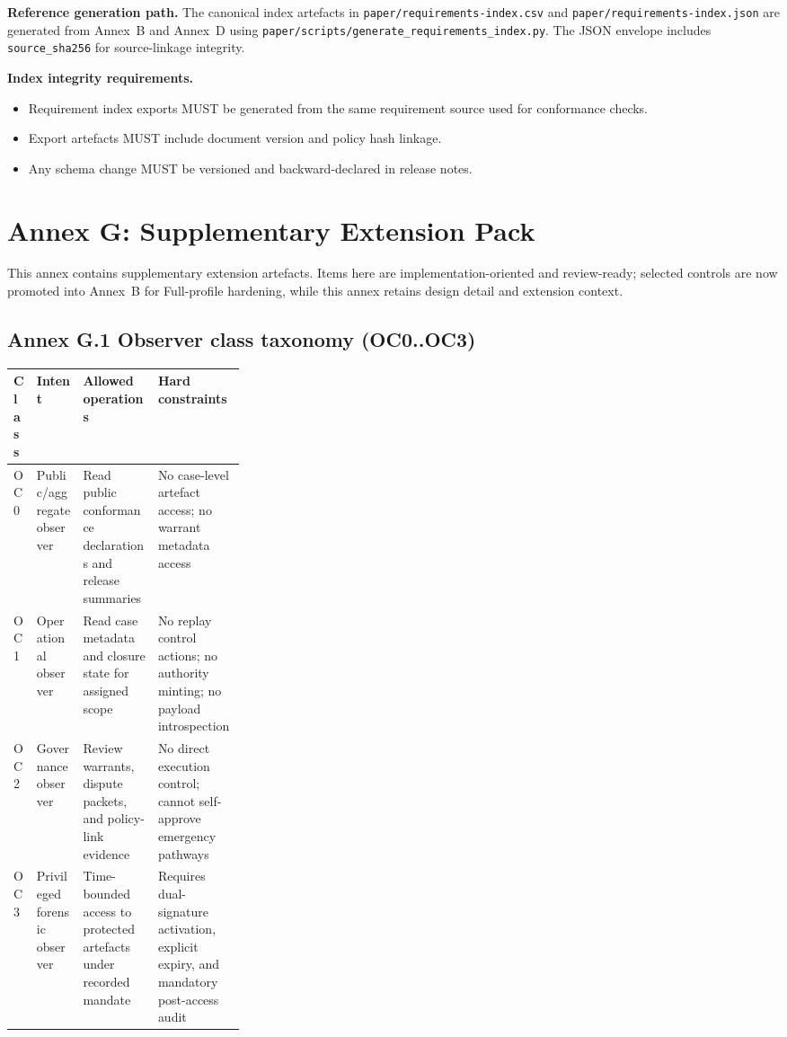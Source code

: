 \documentclass[11pt]{article}
\theoremstyle{definition}
\theoremstyle{plain}
\theoremstyle{remark}
\begin{document}
\textbf{Reference generation path.}
The canonical index artefacts in \texttt{paper/requirements-index.csv} and
\texttt{paper/requirements-index.json} are generated from Annex~B and Annex~D
using \texttt{paper/scripts/generate\_requirements\_index.py}.
The JSON envelope includes \texttt{source\_sha256} for source-linkage integrity.

\textbf{Index integrity requirements.}
\begin{itemize}[leftmargin=*]
  \item Requirement index exports MUST be generated from the same requirement source used for conformance checks.
  \item Export artefacts MUST include document version and policy hash linkage.
  \item Any schema change MUST be versioned and backward-declared in release notes.
\end{itemize}

\section{Annex G: Supplementary Extension Pack}
\label{ann:extension-first-pass}

This annex contains supplementary extension artefacts.
Items here are implementation-oriented and review-ready; selected controls are now promoted into Annex~B for Full-profile hardening, while this annex retains design detail and extension context.

\subsection{Annex G.1 Observer class taxonomy (OC0..OC3)}
\label{ann:ext-obs}

\begin{center}
\small
\setlength{\tabcolsep}{6pt}
\renewcommand{\arraystretch}{1.2}
\begin{tabularx}{0.98\linewidth}{p{0.10\linewidth} p{0.20\linewidth} Y Y}
\textbf{Class} & \textbf{Intent} & \textbf{Allowed operations} & \textbf{Hard constraints} \\ \hline
{}
OC0 & Public/aggregate observer & Read public conformance declarations and release summaries & No case-level artefact access; no warrant metadata access \\
OC1 & Operational observer & Read case metadata and closure state for assigned scope & No replay control actions; no authority minting; no payload introspection \\
OC2 & Governance observer & Review warrants, dispute packets, and policy-link evidence & No direct execution control; cannot self-approve emergency pathways \\
OC3 & Privileged forensic observer & Time-bounded access to protected artefacts under recorded mandate & Requires dual-signature activation, explicit expiry, and mandatory post-access audit \\
\end{tabularx}
\end{center}
\end{document}

